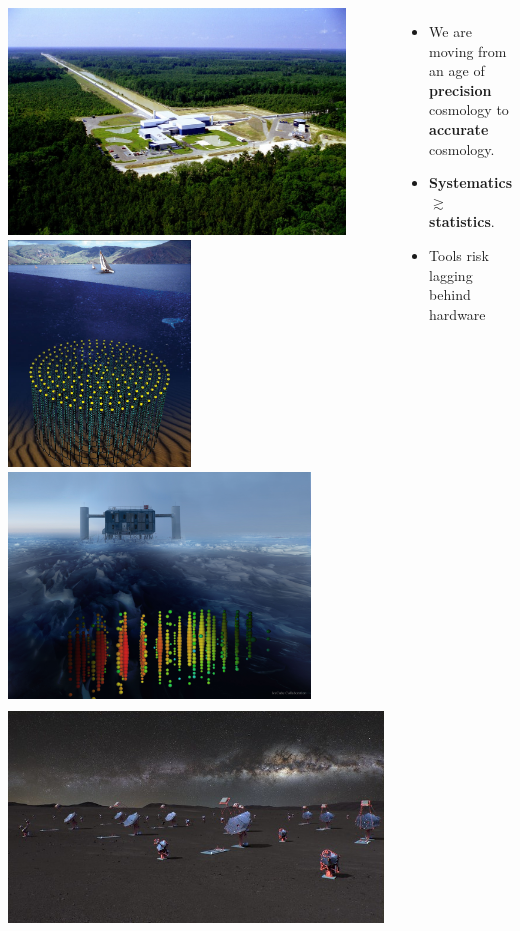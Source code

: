 \documentclass[aspectratio=169]{beamer}
\begin{document}
\begin{frame}
\begin{columns}
        \includegraphics[height=0.18428\textwidth]{figures/telescopes/ligo}%
        \includegraphics[height=0.18428\textwidth]{figures/telescopes/km3n}%
        \includegraphics[height=0.18428\textwidth]{figures/telescopes/icecube}%
        \includegraphics[height=0.18428\textwidth]{figures/telescopes/CTA}%

        \begin{itemize}
            \item We are moving from an age of \textbf{precision} cosmology to \textbf{accurate} cosmology.
            \item \textbf{Systematics} $\gtrsim$ \textbf{statistics}.
            \item Tools risk lagging behind hardware
        \end{itemize}

    \end{columns}
\end{frame}
\end{document}
